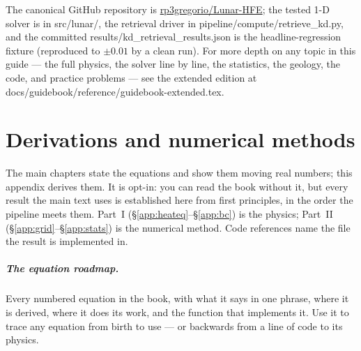 \documentclass[11pt]{report}
\newcommand{\code}[1]{{\ttfamily\small #1}}
\begin{document}
\noindent The canonical GitHub repository is
\href{https://github.com/rp3gregorio/Lunar-HFE}{rp3gregorio/Lunar-HFE}; the
tested 1-D solver is in \code{src/lunar/}, the retrieval driver in
\code{pipeline/compute/retrieve\_kd.py}, and the committed
\code{results/kd\_retrieval\_results.json} is the headline-regression fixture
(reproduced to $\pm0.01$ by a clean run). For more depth on any topic in this
guide --- the full physics, the solver line by line, the statistics, the geology,
the code, and practice problems --- see the extended edition at
\code{docs/guidebook/reference/guidebook-extended.tex}.

\chapter{Derivations and numerical methods}\label{app:deriv}
The main chapters state the equations and show them moving real numbers; this
appendix derives them. It is opt-in: you can read the book without it, but every
result the main text uses is established here from first principles, in the order
the pipeline meets them. Part~I (\S\ref{app:heateq}--\S\ref{app:bc}) is the
physics; Part~II (\S\ref{app:grid}--\S\ref{app:stats}) is the numerical method.
Code references name the file the result is implemented in.

\paragraph{\textbf{The equation roadmap.}} Every numbered equation in the book,
with what it says in one phrase, where it is derived, where it does its work,
and the function that implements it. Use it to trace any equation from birth to
use --- or backwards from a line of code to its physics.
\end{document}
